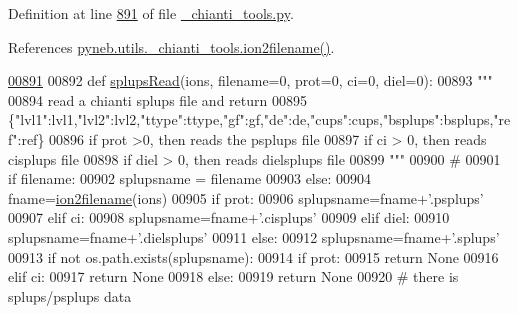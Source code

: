Definition at line \hyperlink{__chianti__tools_8py_source_l00891}{891} of file \hyperlink{__chianti__tools_8py_source}{\-\_\-chianti\-\_\-tools.\-py}.



References \hyperlink{__chianti__tools_8py_source_l00396}{pyneb.\-utils.\-\_\-chianti\-\_\-tools.\-ion2filename()}.


\begin{DoxyCode}
\hypertarget{namespacepyneb_1_1utils_1_1__chianti__tools_l00891}{}\hyperlink{namespacepyneb_1_1utils_1_1__chianti__tools_a6e5e0d51ad5dd162d51353c6d2e49d3b}{00891} 
00892 \textcolor{keyword}{def }\hyperlink{namespacepyneb_1_1utils_1_1__chianti__tools_a6e5e0d51ad5dd162d51353c6d2e49d3b}{splupsRead}(ions, filename=0, prot=0, ci=0,  diel=0):
00893     \textcolor{stringliteral}{"""}
00894 \textcolor{stringliteral}{    read a chianti splups file and return}
00895 \textcolor{stringliteral}{    \{"lvl1":lvl1,"lvl2":lvl2,"ttype":ttype,"gf":gf,"de":de,"cups":cups,"bsplups":bsplups,"ref":ref\}}
00896 \textcolor{stringliteral}{    if prot >0, then reads the psplups file}
00897 \textcolor{stringliteral}{    if ci > 0, then reads cisplups file}
00898 \textcolor{stringliteral}{    if diel > 0, then reads dielsplups file}
00899 \textcolor{stringliteral}{    """}
00900     \textcolor{comment}{#}
00901     \textcolor{keywordflow}{if} filename:
00902         splupsname = filename
00903     \textcolor{keywordflow}{else}:
00904         fname=\hyperlink{namespacepyneb_1_1utils_1_1__chianti__tools_a7748521ca99103785680d691667ce851}{ion2filename}(ions)
00905         \textcolor{keywordflow}{if} prot:
00906             splupsname=fname+\textcolor{stringliteral}{'.psplups'}
00907         \textcolor{keywordflow}{elif} ci:
00908             splupsname=fname+\textcolor{stringliteral}{'.cisplups'}
00909         \textcolor{keywordflow}{elif} diel:
00910             splupsname=fname+\textcolor{stringliteral}{'.dielsplups'}
00911         \textcolor{keywordflow}{else}:
00912             splupsname=fname+\textcolor{stringliteral}{'.splups'}
00913     \textcolor{keywordflow}{if} \textcolor{keywordflow}{not} os.path.exists(splupsname):
00914         \textcolor{keywordflow}{if} prot:
00915             \textcolor{keywordflow}{return} \textcolor{keywordtype}{None}
00916         \textcolor{keywordflow}{elif} ci:
00917             \textcolor{keywordflow}{return} \textcolor{keywordtype}{None}
00918         \textcolor{keywordflow}{else}:
00919             \textcolor{keywordflow}{return} \textcolor{keywordtype}{None}
00920     \textcolor{comment}{# there is splups/psplups data}

\end{DoxyCode}
